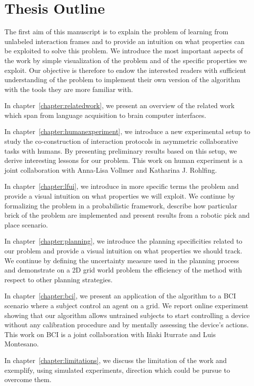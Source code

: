 \cite{grizou2014interactive}
\cite{grizou2014calibration}
\cite{grizou2013robot}


\cite{grizou2014robot}
\cite{grizou2013zero}
\cite{grizou2013interactive}


\section{Thesis Outline}

The first aim of this manuscript is to explain the problem of learning from unlabeled interaction frames and to provide an intuition on what properties can be exploited to solve this problem. We introduce the most important aspects of the work by simple visualization of the problem and of the specific properties we exploit. Our objective is therefore to endow the interested readers with sufficient understanding of the problem to implement their own version of the algorithm with the tools they are more familiar with.

In chapter~\ref{chapter:relatedwork}, we present an overview of the related work which span from language acquisition to brain computer interfaces.

In chapter~\ref{chapter:humanexperiment}, we introduce a new experimental setup to study the co-construction of interaction protocols in asymmetric collaborative tasks with humans. By presenting preliminary results based on this setup, we derive interesting lessons for our problem. This work on human experiment is a joint collaboration with Anna-Lisa Vollmer and Katharina J. Rohlfing. 

In chapter~\ref{chapter:lfui}, we introduce in more specific terms the problem and provide a visual intuition on what properties we will exploit. We continue by formalizing the problem in a probabilistic framework, describe how particular brick of the problem are implemented and present results from a robotic pick and place scenario.

In chapter~\ref{chapter:planning}, we introduce the planning specificities related to our problem and provide a visual intuition on what properties we should track. We continue by defining the uncertainty measure used in the planning process and demonstrate on a 2D grid world problem the efficiency of the method with respect to other planning strategies.

In chapter~\ref{chapter:bci}, we present an application of the algorithm to a BCI scenario where a subject control an agent on a grid. We report online experiment showing that our algorithm allows untrained subjects to start controlling a device without any calibration procedure and by mentally assessing the device's actions. This work on BCI is a joint collaboration with I{\~n}aki Iturrate and Luis Montesano.

In chapter~\ref{chapter:limitations}, we discuss the limitation of the work and exemplify, using simulated experiments, direction which could be pursue to overcome them.
